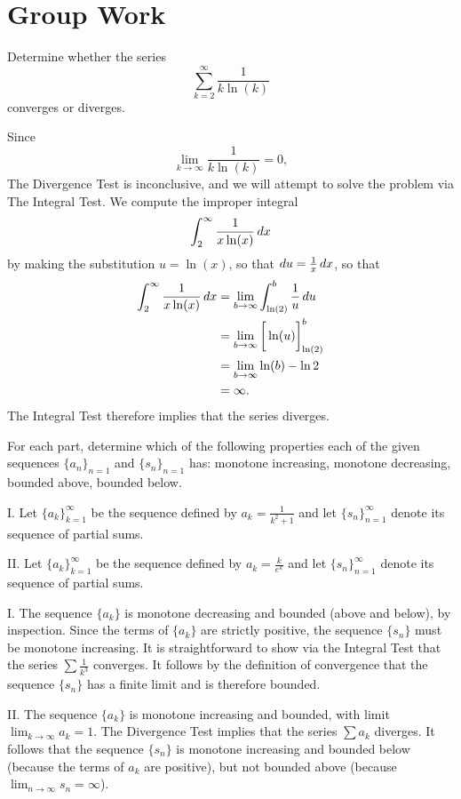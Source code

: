 \documentclass[noauthor]{ximera}
\begin{document}
\section{Group Work}

\begin{problem}
Determine whether the series
$$
\sum_{k=2}^\infty \frac{1}{k \ln (k)}
$$
converges or diverges.

\begin{freeResponse}
Since 
$$
\lim_{k \rightarrow \infty} \frac{1}{k \ln (k)} = 0,
$$
The Divergence Test is inconclusive, and we will attempt to solve the problem via The Integral Test. We compute the improper integral
\begin{align*}
\int_2^\infty \frac{1}{x \ln (x)} \mathop{}\!d x
\end{align*}
by making the substitution $u = \ln (x)$, so that $\mathop{}\!d u = \frac{1}{x} \mathop{}\!d x$, so that 
\begin{align*}
\int_2^\infty \frac{1}{x \ln (x)} \mathop{}\!d x &= \lim_{b \rightarrow \infty} \int_{\ln (2)}^b \frac{1}{u} \mathop{}\!d u \\
&= \lim_{b \rightarrow \infty} \bigg[ \ln(u) \bigg]_{\ln(2)}^b \\
&= \lim_{b \rightarrow \infty} \ln(b) - \ln 2 \\
&= \infty.
\end{align*}
The Integral Test therefore implies that the series diverges.
\end{freeResponse}
\end{problem}

\begin{problem}
For each part, determine which of the following properties each of the given sequences $\{a_n\}_{n=1}$ and $\{s_n\}_{n=1}$ has: monotone increasing, monotone decreasing, bounded above, bounded below. 

I. Let $\{a_k\}_{k=1}^\infty$ be the sequence defined by $a_k = \frac{1}{k^2+1}$ and let $\{s_n\}_{n=1}^\infty$ denote its sequence of partial sums. 

II. Let $\{a_k\}_{k=1}^\infty$ be the sequence defined by $a_k = \frac{k}{e^k}$ and let $\{s_n\}_{n=1}^\infty$ denote its sequence of partial sums.

\begin{freeResponse}
I. The sequence $\{a_k\}$ is monotone decreasing and bounded (above and below), by inspection. Since the terms of $\{a_k\}$ are strictly positive, the sequence $\{s_n\}$ must be monotone increasing. It is straightforward to show via the Integral Test that the series $\sum \frac{1}{k^3}$ converges. It follows by the definition of convergence that the sequence $\{s_n\}$ has a finite limit and is therefore bounded.

II. The sequence $\{a_k\}$ is monotone increasing and bounded, with limit $\lim_{k\rightarrow \infty} a_k = 1$. The Divergence Test implies that the series $\sum a_k$ diverges. It follows that the sequence $\{s_n\}$ is monotone increasing and bounded below (because the terms of $a_k$ are positive), but not bounded above (because $\lim_{n \rightarrow \infty} s_n = \infty$). 
\end{freeResponse}
\end{problem}
\end{document}
